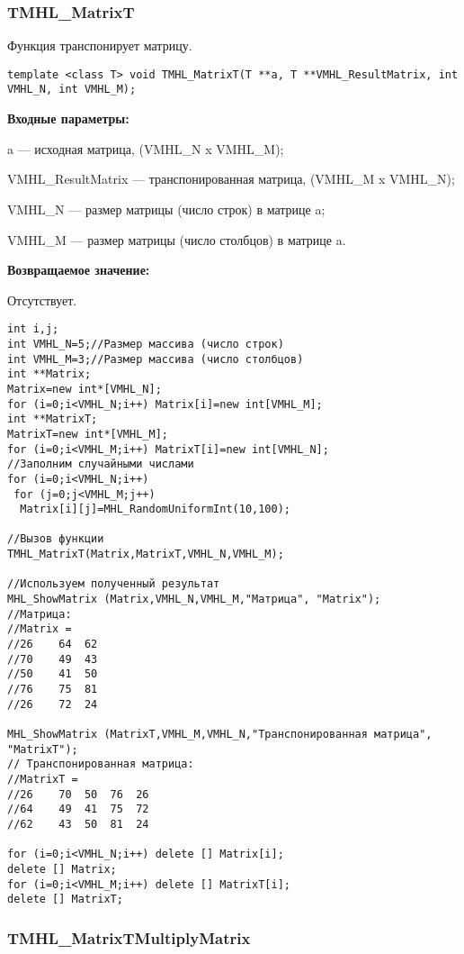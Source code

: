 \documentclass[a4paper,12pt]{article}
\begin{document}
\subsubsection{TMHL\_MatrixT}\label{TMHL_MatrixT}

Функция транспонирует матрицу.


\begin{lstlisting}[label=code_syntax_TMHL_MatrixT,caption=Синтаксис]
template <class T> void TMHL_MatrixT(T **a, T **VMHL_ResultMatrix, int VMHL_N, int VMHL_M);
\end{lstlisting}

\textbf{Входные параметры:}

 a --- исходная матрица, (VMHL\_N x VMHL\_M);
 
 VMHL\_ResultMatrix --- транспонированная матрица, (VMHL\_M x VMHL\_N);
 
 VMHL\_N --- размер матрицы (число строк) в матрице a;
 
 VMHL\_M --- размер матрицы (число столбцов) в матрице a.

\textbf{Возвращаемое значение:}

Отсутствует.


\begin{lstlisting}[label=code_use_TMHL_MatrixT,caption=Пример использования]
int i,j;
int VMHL_N=5;//Размер массива (число строк)
int VMHL_M=3;//Размер массива (число столбцов)
int **Matrix;
Matrix=new int*[VMHL_N];
for (i=0;i<VMHL_N;i++) Matrix[i]=new int[VMHL_M];
int **MatrixT;
MatrixT=new int*[VMHL_M];
for (i=0;i<VMHL_M;i++) MatrixT[i]=new int[VMHL_N];
//Заполним случайными числами
for (i=0;i<VMHL_N;i++)
 for (j=0;j<VMHL_M;j++)
  Matrix[i][j]=MHL_RandomUniformInt(10,100);

//Вызов функции
TMHL_MatrixT(Matrix,MatrixT,VMHL_N,VMHL_M);

//Используем полученный результат
MHL_ShowMatrix (Matrix,VMHL_N,VMHL_M,"Матрица", "Matrix");
//Матрица:
//Matrix =
//26	64	62
//70	49	43
//50	41	50
//76	75	81
//26	72	24

MHL_ShowMatrix (MatrixT,VMHL_M,VMHL_N,"Транспонированная матрица", "MatrixT");
// Транспонированная матрица:
//MatrixT =
//26	70	50	76	26
//64	49	41	75	72
//62	43	50	81	24

for (i=0;i<VMHL_N;i++) delete [] Matrix[i];
delete [] Matrix;
for (i=0;i<VMHL_M;i++) delete [] MatrixT[i];
delete [] MatrixT;
\end{lstlisting}

\subsubsection{TMHL\_MatrixTMultiplyMatrix}\label{TMHL_MatrixTMultiplyMatrix}
\end{document}
